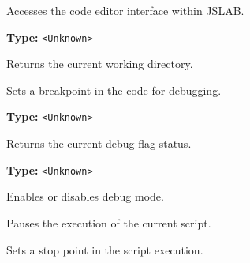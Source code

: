 \documentclass[12pt,a4paper]{article}
\begin{document}
\noindent Accesses the code editor interface within JSLAB.

\vspace{5mm}
\noindent {}\vspace{4mm}


\noindent \textbf{Type:} \texttt{<Unknown>}

\noindent Returns the current working directory.

\vspace{5mm}
\noindent {}


\noindent Sets a breakpoint in the code for debugging.

\vspace{5mm}
\noindent {}\vspace{4mm}


\noindent \textbf{Type:} \texttt{<Unknown>}

\noindent Returns the current debug flag status.

\vspace{5mm}
\noindent {}\vspace{4mm}


\noindent \textbf{Type:} \texttt{<Unknown>}

\noindent Enables or disables debug mode.

\vspace{5mm}
\noindent {}


\noindent Pauses the execution of the current script.

\vspace{5mm}
\noindent {}


\noindent Sets a stop point in the script execution.

\vspace{5mm}
\noindent {}
\end{document}
